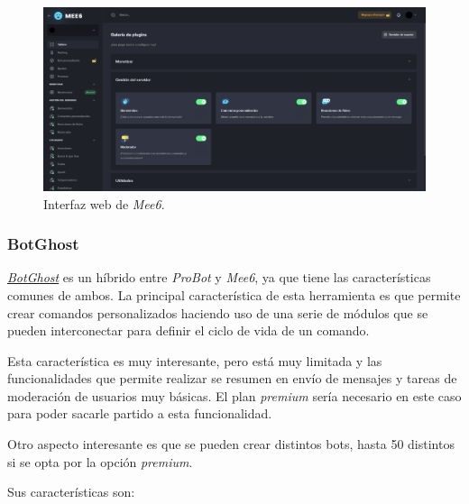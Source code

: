 \begin{figure}[H]
	\centering
	\includegraphics[width=1\textwidth]{img/mee6.png}
	\caption{Interfaz web de \textit{Mee6}.}
\end{figure}


\subsubsection{BotGhost}

\href{https://botghost.com/}{\textit{BotGhost}} es un híbrido entre \textit{ProBot} y \textit{Mee6}, ya que tiene las características comunes de ambos. La principal característica de esta herramienta es que permite crear comandos personalizados haciendo uso de una serie de módulos que se pueden interconectar para definir el ciclo de vida de un comando.

Esta característica es muy interesante, pero está muy limitada y las funcionalidades que permite realizar se resumen en envío de mensajes y tareas de moderación de usuarios muy básicas. El plan \textit{premium} sería necesario en este caso para poder sacarle partido a esta funcionalidad.

Otro aspecto interesante es que se pueden crear distintos bots, hasta 50 distintos si se opta por la opción \textit{premium}.

Sus características son:


